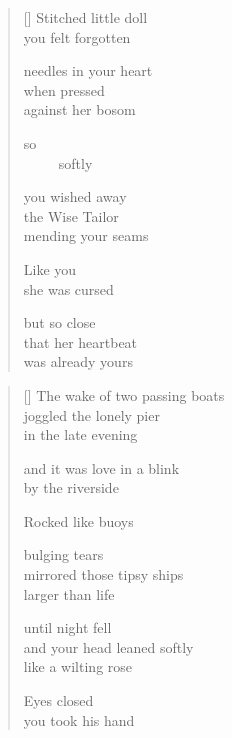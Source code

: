 \documentclass[12pt,a4paper]{article}
\begin{document}
\newpage

\poemtitle{}

\settowidth{\versewidth}{needles in your heart}

\bigskip

\begin{verse}[\versewidth]
  Stitched little doll \\
  you felt forgotten

  needles in your heart \\
  when pressed \\
  against her bosom

  so \\
  \ \ \ \ \ softly

  you wished away \\
  the Wise Tailor \\
  mending your seams

  Like you \\
  she was cursed

  but so close \\
  that her heartbeat \\
  was already yours
\end{verse}


\newpage

\poemtitle{}

\settowidth{\versewidth}{The wake of two passing boats}

\bigskip

\begin{verse}[\versewidth]
  The wake of two passing boats \\
  joggled the lonely pier \\
  in the late evening

  and it was love in a blink \\
  by the riverside

  Rocked like buoys

  bulging tears \\
  mirrored those tipsy ships \\
  larger than life

  until night fell \\
  and your head leaned softly \\
  like a wilting rose

  Eyes closed \\
  you took his hand
\end{verse}
\end{document}
